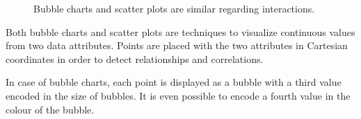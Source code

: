 \begin{figure}
  \centering
  \caption{Bubble charts and scatter plots are similar regarding interactions.}%
  \label{fig:analysis:bubble-chart}
  \qquad
\end{figure}

Both bubble charts and scatter plots are techniques to visualize continuous values from two data attributes.
Points are placed with the two attributes in Cartesian coordinates in order to detect relationships and correlations.

In case of bubble charts, each point is displayed as a bubble with a third value encoded in the size of bubbles.
It is even possible to encode a fourth value in the colour of the bubble.

